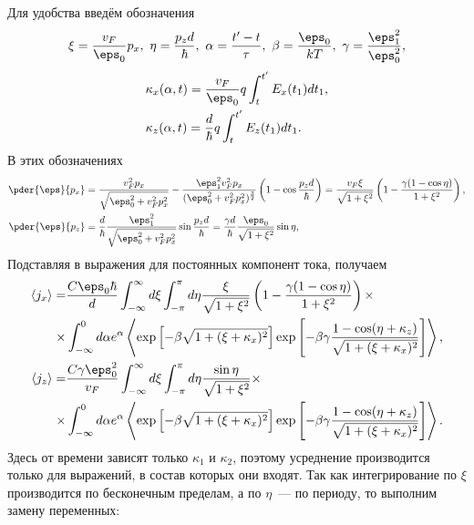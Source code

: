   Для удобства введём обозначения
  \begin{equation*}
    \xi = \frac{v_F}{\eps_0} p_x,\ \eta = \frac{p_z d}{\hbar},\ \alpha =
    \frac{t'-t}{\tau},\ \beta = \frac{\eps_0}{kT},
    \ \gamma = \frac{\eps_1^2}{\eps_0^2},
  \end{equation*}
  \begin{align*}
    & \kappa_x(\alpha, t) = \frac{v_F}{\eps_0}
      q\int_t^{t'}E_x(t_1) dt_1,\\
    & \kappa_z(\alpha, t) = \frac{d}{\hbar} q\int_t^{t'}E_z(t_1) dt_1.
  \end{align*}
  В этих обозначениях
  \begin{align*}
    \pder{\eps}{p_x}& = \frac{v_F^2 p_x}{\sqrt{\eps_0^2 + v_F^2 p_x^2}} -
      \frac{\eps_1^2v_F^2 p_x}{(\eps_0^2 + v_F^2
      p_x^2)^\frac{3}{2}}\left(1-\cos\frac{p_z d}{\hbar}\right) =
    \frac{v_F \xi}{\sqrt{1 + \xi^2}}\left( 1 - \frac{\gamma(1-\cos\eta)}{1 + \xi^2}\right),\\
    \pder{\eps}{p_z}& = \frac{d}{\hbar}\frac{\eps_1^2}{\sqrt{\eps_0^2 + v_F^2
    p_x^2}}\sin\frac{p_z d}{\hbar} =
    \frac{\gamma d}{\hbar}\frac{\eps_0}{\sqrt{1+\xi^2}}\sin\eta,
  \end{align*}
Подставляя в выражения для постоянных компонент тока, получаем
\begin{align*}
  \langle j_x \rangle =& \frac{C\eps_0\hbar}{d} \int_{-\infty}^\infty d\xi \int_{-\pi}^\pi d\eta \frac{\xi}{\sqrt{1 + \xi^2}}\left( 1 - \frac{\gamma(1-\cos\eta)}{1 + \xi^2}\right)
    \times\\\times&
\int_{-\infty}^{0} d \alpha e^\alpha\left\langle\exp\left[-\beta\sqrt{1+(\xi + \kappa_x)^2}\right]
  \exp\left[-\beta\gamma\frac{1-\cos(\eta + \kappa_z)}{\sqrt{1+(\xi + \kappa_x)^2}}\right]\right\rangle,\\
  \langle j_z \rangle =& \frac{C\gamma\eps_0^2}{v_F} \int_{-\infty}^\infty d\xi \int_{-\pi}^\pi d\eta \frac{\sin\eta}{\sqrt{1+\xi^2}}
    \times\\\times&
  \int_{-\infty}^{0} d \alpha e^\alpha\left\langle\exp\left[-\beta\sqrt{1+(\xi + \kappa_x)^2}\right]
  \exp\left[-\beta\gamma\frac{1-\cos(\eta + \kappa_z)}{\sqrt{1+(\xi + \kappa_x)^2}}\right]\right\rangle.
\end{align*}
Здесь от времени зависят только \( \kappa_1 \) и \( \kappa_2 \), поэтому усреднение производится только для выражений, в состав которых они входят. Так как интегрирование по \( \xi \) производится по бесконечным пределам, а по \( \eta \)~--- по периоду, то выполним замену переменных:

